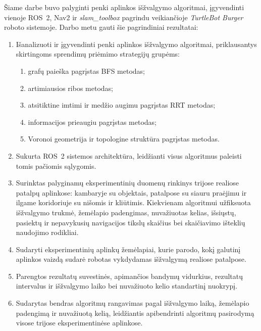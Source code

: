\documentclass[]{VUMIFTemplateClass}
\begin{document}
Šiame darbe buvo palyginti penki aplinkos išžvalgymo algoritmai, įgyvendinti vienoje ROS~2, Nav2 ir \textit{slam\_toolbox} pagrindu veikiančioje
\textit{TurtleBot Burger} roboto sistemoje. Darbo metu gauti šie pagrindiniai rezultatai:

\begin{enumerate}
  \item Išanalizuoti ir įgyvendinti penki aplinkos išžvalgymo algoritmai, priklausantys skirtingoms sprendimų priėmimo strategijų grupėms:
  \begin{enumerate}
      \item grafų paieška pagrįstas BFS metodas;
      \item artimiausios ribos metodas;
      \item atsitiktine imtimi ir medžio augimu pagrįstas RRT metodas;
      \item informacijos prieaugiu pagrįstas metodas;
      \item Voronoi geometrija ir topologine struktūra pagrįstas metodas.
  \end{enumerate}

\item Sukurta ROS~2 sistemos architektūra, leidžianti visus algoritmus paleisti tomis pačiomis sąlygomis.

\item Surinktas palyginamų eksperimentinių duomenų rinkinys trijose realiose patalpų aplinkose: kambaryje su objektais, patalpose su siauru praėjimu ir ilgame
koridoriuje su nišomis ir kliūtimis. Kiekvienam algoritmui užfiksuota išžvalgymo trukmė, žemėlapio padengimas, nuvažiuotas kelias, išsiųstų, pasiektų ir nepavykusių       
navigacijos tikslų skaičius bei skaičiavimo išteklių naudojimo rodikliai.

\item Sudaryti eksperimentinių aplinkų žemėlapiai, kurie parodo, kokį galutinį aplinkos vaizdą sudarė robotas vykdydamas išžvalgymą realiose patalpose.

\item Parengtos rezultatų suvestinės, apimančios bandymų vidurkius, rezultatų intervalus ir išžvalgymo laiko bei nuvažiuoto kelio standartinį nuokrypį.

\item Sudarytas bendras algoritmų rangavimas pagal išžvalgymo laiką, žemėlapio padengimą ir nuvažiuotą kelią, leidžiantis apibendrinti algoritmų pasirodymą
visose trijose eksperimentinėse aplinkose.

\end{enumerate}
\end{document}
